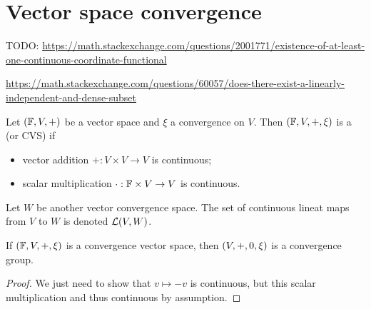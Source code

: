 \chapter{Vector space convergence}
TODO: \url{https://math.stackexchange.com/questions/2001771/existence-of-at-least-one-continuous-coordinate-functional}

\url{https://math.stackexchange.com/questions/60057/does-there-exist-a-linearly-independent-and-dense-subset}

\begin{definition}
Let $\sSet{\F,V,+}$ be a vector space and $\xi$ a convergence on $V$. Then $\sSet{\F,V,+, \xi}$ is a  (or CVS) if
\begin{itemize}
\item vector addition $+: V\times V \to V$ is continuous;
\item scalar multiplication $\cdot: \mathbb{F}\times V \to V$ is continuous.
\end{itemize}
Let $W$ be another vector convergence space. The set of continuous lineat maps from $V$ to $W$ is denoted $\operatorname{\mathcal{L}}(V,W)$.
\end{definition}

\begin{lemma}
If $\sSet{\F,V,+, \xi}$ is a convergence vector space, then $\sSet{V,+, 0, \xi}$ is a convergence group.
\end{lemma}
\begin{proof}
We just need to show that $v\mapsto -v$ is continuous, but this scalar multiplication and thus continuous by assumption.
\end{proof}

